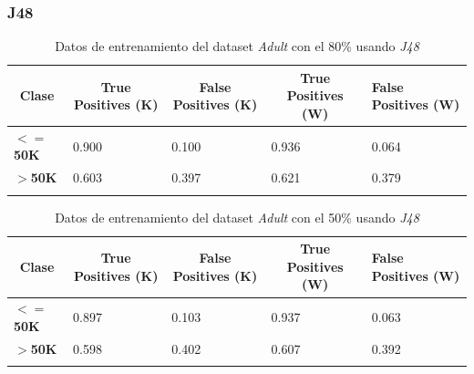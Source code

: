 \documentclass[10pt,a4paper]{article}
\begin{document}
\newpage
\subsubsection{J48}

\begin{table}[h]
\begin{tabular}{lllll}
\hline
\multicolumn{1}{|c|}{\textbf{Clase}} & \multicolumn{1}{c|}{\textbf{True Positives (K)}} & \multicolumn{1}{c|}{\textbf{False Positives (K)}} & \multicolumn{1}{c|}{\textbf{True Positives (W)}} & \multicolumn{1}{l|}{\textbf{False Positives (W)}} \\ \hline
\multicolumn{1}{|l|}{\textbf{$<=$50K}} & \multicolumn{1}{l|}{0.900}          & \multicolumn{1}{l|}{0.100}          & \multicolumn{1}{l|}{0.936}          & \multicolumn{1}{l|}{0.064} \\ \hline
\multicolumn{1}{|l|}{\textbf{$>$50K}} & \multicolumn{1}{l|}{0.603}          & \multicolumn{1}{l|}{0.397}          & \multicolumn{1}{l|}{0.621}          & \multicolumn{1}{l|}{0.379} \\ \hline
\textbf{}                       &                                &                                &                                &                      
\end{tabular}
\caption{Datos de entrenamiento del dataset \emph{Adult} con el 80\% usando \emph{J48}}
\label{tab:adult_j48_80}
\end{table}

\begin{table}[h]
\begin{tabular}{lllll}
\hline
\multicolumn{1}{|c|}{\textbf{Clase}} & \multicolumn{1}{c|}{\textbf{True Positives (K)}} & \multicolumn{1}{c|}{\textbf{False Positives (K)}} & \multicolumn{1}{c|}{\textbf{True Positives (W)}} & \multicolumn{1}{l|}{\textbf{False Positives (W)}} \\ \hline
\multicolumn{1}{|l|}{\textbf{$<=$50K}} & \multicolumn{1}{l|}{0.897}          & \multicolumn{1}{l|}{0.103}          & \multicolumn{1}{l|}{0.937}          & \multicolumn{1}{l|}{0.063} \\ \hline
\multicolumn{1}{|l|}{\textbf{$>$50K}} & \multicolumn{1}{l|}{0.598}          & \multicolumn{1}{l|}{0.402}          & \multicolumn{1}{l|}{0.607}          & \multicolumn{1}{l|}{0.392} \\ \hline
\textbf{}                       &                                &                                &                                &                      
\end{tabular}
\caption{Datos de entrenamiento del dataset \emph{Adult} con el 50\% usando \emph{J48}}
\label{tab:adult_j48_50}
\end{table}
\end{document}
